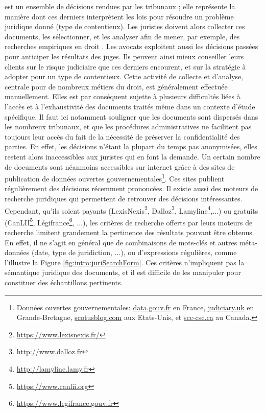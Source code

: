 est un ensemble de décisions rendues par les tribunaux ; elle représente la manière dont ces derniers interprètent les lois pour résoudre un problème juridique donné (type de contentieux). Les juristes doivent alors collecter ces documents, les sélectionner, et les analyser afin de mener, par exemple, des recherches empiriques en droit \citep{ancel2003expulsion, jeandidier2006pensions}. Les avocats exploitent aussi les décisions passées pour anticiper les résultats des juges. Ils peuvent ainsi mieux conseiller leurs clients sur le risque judiciaire que ces derniers encourent, et sur la stratégie à adopter pour un type de contentieux. Cette activité de collecte et d'analyse, centrale pour de nombreux métiers du droit, est généralement effectuée manuellement. Elles est par conséquent sujette à plusieurs difficultés liées à l'accès et à l'exhaustivité des documents traités même dans un contexte d'étude spécifique. Il faut ici notamment souligner que les documents sont dispersés dans les nombreux tribunaux, et que les procédures administratives ne facilitent pas toujours leur accès du fait de la nécessité de préserver la confidentialité des parties. En effet, les décisions n'étant la plupart du temps pas anonymisées, elles restent alors inaccessibles aux juristes qui en font la demande. Un certain nombre de documents sont néanmoins accessibles sur internet grâce à des sites de publication de données ouvertes gouvernementales\footnote{Données ouvertes gouvernementales: \hyperlink{http://data.gouv.fr}{data.gouv.fr} en France, \hyperlink{https://www.judiciary.uk}{judiciary.uk} en Grande-Bretagne, \hyperlink{http://www.scotusblog.com/}{scotusblog.com} aux Etats-Unis, et \hyperlink{https://www.scc-csc.ca/}{scc-csc.ca} au Canada.}. Ces sites publient régulièrement des décisions récemment prononcées.  Il existe aussi des moteurs de recherche juridiques qui permettent de retrouver des décisions intéressantes. Cependant, qu'ils soient payants (LexisNexis\footnote{\url{https://www.lexisnexis.fr/}}, Dalloz\footnote{\url{http://www.dalloz.fr}}, Lamyline\footnote{\url{http://lamyline.lamy.fr}},...) ou gratuits (CanLII\footnote{\url{https://www.canlii.org}}, Légifrance\footnote{\url{https://www.legifrance.gouv.fr}}, ...), les critères de recherche offerts par leurs moteurs de recherche limitent grandement la pertinence des résultats pouvant être obtenus. En effet, il ne s'agit en général que de combinaisons de mots-clés et autres méta-données (date, type de juridiction, ...), ou d'expressions régulières, comme l'illustre la Figure \ref{fig:intro:juriSearchForm}. Ces critères n'impliquent pas la sémantique juridique des documents, et il est difficile de les manipuler pour constituer des échantillons pertinents. 

